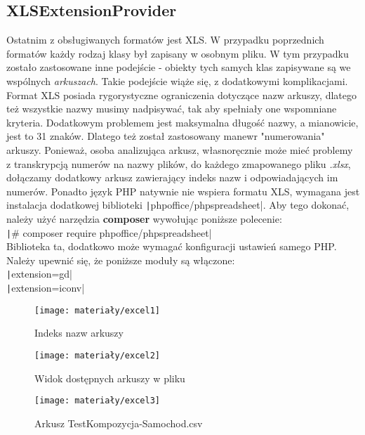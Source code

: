 \subsection{XLSExtensionProvider}
Ostatnim z obsługiwanych formatów jest XLS. W przypadku poprzednich formatów każdy rodzaj klasy był zapisany w osobnym pliku. W tym przypadku zostało zastosowane inne podejście - obiekty tych samych klas zapisywane są we wspólnych \textit{arkuszach}. Takie podejście wiąże się, z dodatkowymi komplikacjami. Format XLS posiada rygorystyczne ograniczenia dotyczące nazw arkuszy, dlatego też wszystkie nazwy musimy nadpisywać, tak aby spełniały one wspomniane kryteria. Dodatkowym problemem jest maksymalna długość nazwy, a mianowicie, jest to 31 znaków. Dlatego też został zastosowany manewr "numerowania" arkuszy. Ponieważ, osoba analizująca arkusz, własnoręcznie może mieć problemy z transkrypcją numerów na nazwy plików, do każdego zmapowanego pliku \textit{.xlsx}, dołączamy dodatkowy arkusz zawierający indeks nazw i odpowiadających im numerów. Ponadto język PHP natywnie nie wspiera formatu XLS, wymagana jest instalacja dodatkowej biblioteki \texttt|phpoffice/phpspreadsheet|. Aby tego dokonać, należy użyć narzędzia \textbf{composer} wywołując poniższe polecenie:\\
\texttt|# composer require phpoffice/phpspreadsheet|\\
Biblioteka ta, dodatkowo może wymagać konfiguracji ustawień samego PHP. Należy upewnić się, że poniższe moduły są włączone:\\
\texttt|extension=gd|\\
\texttt|extension=iconv|\\

\begin{figure}[ht]
	\centering
	\texttt{[image: materiały/excel1]}
	\caption{Indeks nazw arkuszy}
\end{figure}

\begin{figure}[ht]
	\centering
	\texttt{[image: materiały/excel2]}
	\caption{Widok dostępnych arkuszy w pliku}
\end{figure}

\begin{figure}[ht]
	\centering
	\texttt{[image: materiały/excel3]}
	\caption{Arkusz TestKompozycja-Samochod.csv}
\end{figure}